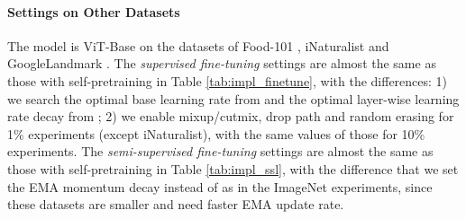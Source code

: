\documentclass{article}
\begin{document}
\paragraph{Settings on Other Datasets}
The model is ViT-Base on the datasets of Food-101 \cite{DBLP:conf/eccv/BossardGG14}, iNaturalist \cite{DBLP:journals/corr/HornASSAPB17} and GoogleLandmark \cite{DBLP:conf/iccv/NohASWH17}. The \emph{supervised fine-tuning} settings are almost the same as those with self-pretraining in Table \ref{tab:impl_finetune}, with the differences: 1) we search the optimal base learning rate from  and the optimal layer-wise learning rate decay from ; 2) we enable mixup/cutmix, drop path and random erasing for 1\% experiments (except iNaturalist), with the same values of those for 10\% experiments. The \emph{semi-supervised fine-tuning} settings are almost the same as those with self-pretraining in Table \ref{tab:impl_ssl}, with the difference that we set the EMA momentum decay  instead of  as in the ImageNet experiments, since these datasets are smaller and need faster EMA update rate.

 
\end{document}
